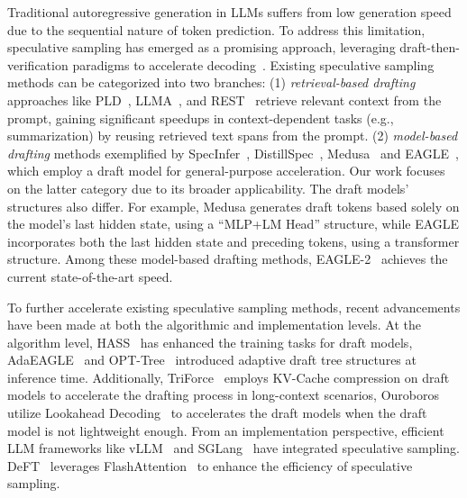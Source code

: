Traditional autoregressive generation in LLMs suffers from low generation speed due to the sequential nature of token prediction. To address this limitation, speculative sampling has emerged as a promising approach, leveraging draft-then-verification paradigms to accelerate decoding~\cite{microsoftspec, googlespec, deepmindspec}. Existing speculative sampling methods can be categorized into two branches:
(1) \textit{retrieval-based drafting} approaches like PLD~\cite{pld}, LLMA~\cite{llma}, and REST~\cite{rest} retrieve relevant context from the prompt, gaining significant speedups in context-dependent tasks (e.g., summarization) by reusing retrieved text spans from the prompt.
(2) \textit{model-based drafting} methods exemplified by SpecInfer~\cite{specinfer}, DistillSpec~\cite{distillspec}, Medusa~\cite{medusa} and EAGLE~\cite{eagle2}, which employ a draft model for general-purpose acceleration. Our work focuses on the latter category due to its broader applicability.
The draft models' structures also differ. For example, Medusa generates draft tokens based solely on the model's last hidden state, using a ``MLP+LM Head'' structure, while EAGLE incorporates both the last hidden state and preceding tokens, using a transformer structure. Among these model-based drafting methods, EAGLE-2~\cite{eagle2} achieves the current state-of-the-art speed.

To further accelerate existing speculative sampling methods, recent advancements have been made at both the algorithmic and implementation levels.
At the algorithm level, HASS~\cite{zhang2025learning} has enhanced the training tasks for draft models, AdaEAGLE~\cite{zhang2024adaeagle} and OPT-Tree~\cite{wang2024opt} introduced adaptive draft tree structures at inference time. Additionally, TriForce~\cite{triforce} employs KV-Cache compression on draft models to accelerate the drafting process in long-context scenarios, Ouroboros~\cite{zhao-etal-2024-ouroboros} utilize Lookahead Decoding~\cite{fu2024break} to accelerates the draft models when the draft model is not lightweight enough.
From an implementation perspective, efficient LLM frameworks like vLLM~\cite{kwon2023efficient} and SGLang~\cite{zheng2024sglang} have integrated speculative sampling. DeFT~\cite{yao2025deft} leverages FlashAttention~\cite{flashattention-2} to enhance the efficiency of speculative sampling.